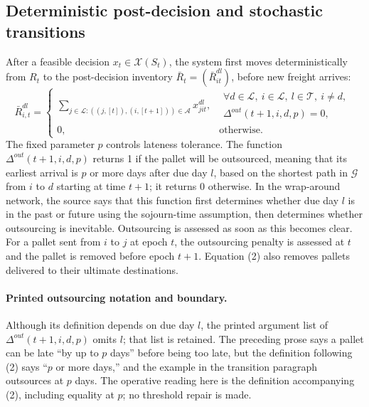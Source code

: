 \documentclass{article}
\begin{document}
\subsection*{Deterministic post-decision and stochastic transitions}
After a feasible decision $x_t\in\mathcal{X}(S_t)$, the system first moves deterministically from $R_t$ to the post-decision inventory $\bar R_t=(\bar R_{it}^{dl})$, before new freight arrives:
\begin{equation}
\bar R_{i,t}^{dl}=
\begin{cases}
\displaystyle\sum_{j\in\mathcal{L}:((j,[t]),(i,[t+1]))\in\mathcal{A}}x_{jit}^{dl},
&\begin{gathered}
\forall d\in\mathcal{L},\ i\in\mathcal{L},\ l\in\mathcal{T},\ i\ne d,\\[-2pt]
\Delta^{out}(t+1,i,d,p)=0,
\end{gathered}\\
0,&\text{otherwise}.
\end{cases}
\tag{2}
\end{equation}
The fixed parameter $p$ controls lateness tolerance. The function $\Delta^{out}(t+1,i,d,p)$ returns 1 if the pallet will be outsourced, meaning that its earliest arrival is $p$ or more days after due day $l$, based on the shortest path in $\mathcal{G}$ from $i$ to $d$ starting at time $t+1$; it returns 0 otherwise. In the wrap-around network, the source says that this function first determines whether due day $l$ is in the past or future using the sojourn-time assumption, then determines whether outsourcing is inevitable. Outsourcing is assessed as soon as this becomes clear. For a pallet sent from $i$ to $j$ at epoch $t$, the outsourcing penalty is assessed at $t$ and the pallet is removed before epoch $t+1$. Equation (2) also removes pallets delivered to their ultimate destinations.

\paragraph{Printed outsourcing notation and boundary.}
Although its definition depends on due day $l$, the printed argument list of $\Delta^{out}(t+1,i,d,p)$ omits $l$; that list is retained. The preceding prose says a pallet can be late ``by up to $p$ days'' before being too late, but the definition following (2) says ``$p$ or more days,'' and the example in the transition paragraph outsources at $p$ days. The operative reading here is the definition accompanying (2), including equality at $p$; no threshold repair is made.
\end{document}

